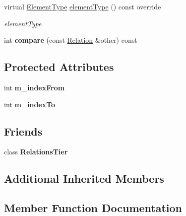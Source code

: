 \begin{DoxyCompactItemize}
virtual \hyperlink{class_annotation_element_af5282990ffbe25eeea8ab02037e344b0}{Element\+Type} \hyperlink{class_relation_a31e74e5707090aedfa225289b06683f4}{element\+Type} () const override
\begin{DoxyCompactList}\small\item\em element\+Type \end{DoxyCompactList}\item 
\mbox{\label{class_relation_a3beae786b907afb5ef709e63eecc8b6b}} 
int {\bfseries compare} (const \hyperlink{class_relation}{Relation} \&other) const
\end{DoxyCompactItemize}
\subsection*{Protected Attributes}
\begin{DoxyCompactItemize}
\item 
\mbox{\label{class_relation_a64f89fd00e28838b22d126c9329fa348}} 
int {\bfseries m\+\_\+index\+From}
\item 
\mbox{\label{class_relation_a97e8c4d1e08944a1332b84e18e73a395}} 
int {\bfseries m\+\_\+index\+To}
\end{DoxyCompactItemize}
\subsection*{Friends}
\begin{DoxyCompactItemize}
\item 
\mbox{\label{class_relation_a73055847496439d12dc28c39451725d5}} 
class {\bfseries Relations\+Tier}
\end{DoxyCompactItemize}
\subsection*{Additional Inherited Members}


\subsection{Member Function Documentation}
\mbox{\label{class_relation_a424ac3f46c1a62f2f72592dcf10d1f1e}} 
